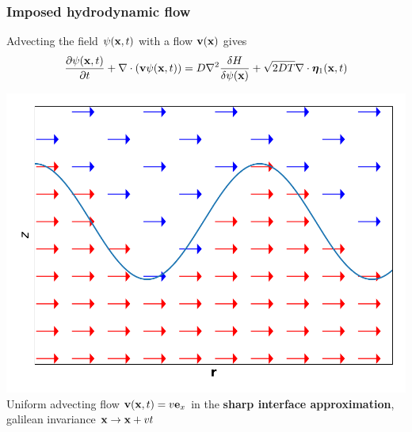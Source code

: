 \documentclass[9pt, dvipsnames,aspectratio=169]{beamer} %
\newcommand{\bx}{{\bf x}} %
\newcommand{\bv}{{\bf v}}
\begin{document}
\begin{frame}
    \frametitle{Imposed hydrodynamic flow}
    Advecting the field $\psi(\bx,t)$ with a flow $\bv(\bx)$ gives
    \begin{equation}
       \frac{\partial \psi(\bx,t)}{\partial t} + \nabla \cdot ( \bv \psi(\bx,t) ) = D\nabla^2\frac{\delta H}{\delta \psi(\bx)}+ \sqrt{2D T}\nabla \cdot {\bm \eta}_1(\bx,t) 
    \end{equation}

    \centering
    \includegraphics[scale=0.4]{driven.pdf}  \\
    Uniform advecting flow $\bv(\bx,t) = v {\bf e}_x$ in the {\bf sharp interface approximation}, galilean invariance $\bx \to \bx + v t$
\end{frame}
\end{document}
